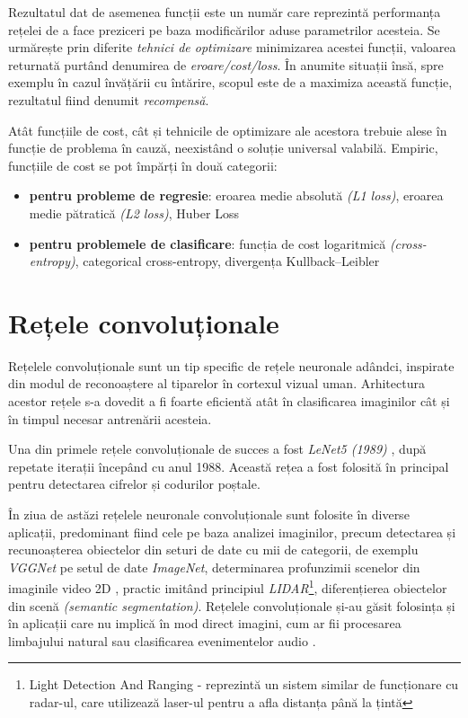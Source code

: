 Rezultatul dat de asemenea funcții este un număr care reprezintă performanța rețelei de a face preziceri pe baza modificărilor aduse parametrilor acesteia. Se urmărește prin diferite \textit{tehnici de optimizare} minimizarea acestei funcții, valoarea returnată purtând denumirea de \textit{eroare/cost/loss}. În anumite situații însă, spre exemplu în cazul învățării cu întărire, scopul este de a maximiza această funcție, rezultatul fiind denumit \textit{recompensă}.

Atât funcțiile de cost, cât și tehnicile de optimizare ale acestora trebuie alese în funcție de problema în cauză, neexistând o soluție universal valabilă. Empiric, funcțiile de cost se pot împărți în două categorii:
\begin{itemize}
\item \textbf{pentru probleme de regresie}: eroarea medie absolută \textit{(L1 loss)}, eroarea medie pătratică \textit{(L2 loss)},  Huber Loss
\item \textbf{pentru problemele de clasificare}: funcția de cost logaritmică \textit{(cross-entropy)}, categorical cross-entropy, divergența Kullback–Leibler
\end{itemize}

\section{Rețele convoluționale}\label{sec:reteleconv}
Rețelele convoluționale sunt un tip specific de rețele neuronale adândci, inspirate din modul de reconoaștere al tiparelor în cortexul vizual uman. Arhitectura acestor rețele s-a dovedit a fi foarte eficientă atât în clasificarea imaginilor cât și în timpul necesar antrenării acesteia.

Una din primele rețele convoluționale de succes a fost \textit{LeNet5 (1989)} \cite{LeNet5}, după repetate iterații începând cu anul 1988. Această rețea a fost folosită în principal pentru detectarea cifrelor și codurilor poștale.

În ziua de astăzi rețelele neuronale convoluționale sunt folosite în diverse aplicații, predominant fiind cele pe baza analizei imaginilor, precum detectarea și recunoașterea obiectelor din seturi de date cu mii de categorii, de exemplu \textit{VGGNet} \cite{simonyan2014deep} pe setul de date \textit{ImageNet}, determinarea profunzimii scenelor din imaginile video 2D \cite{zhou2017unsupervised}, practic imitând principiul \textit{LIDAR}\footnote{Light Detection And Ranging - reprezintă un sistem similar de funcționare cu radar-ul, care utilizează laser-ul pentru a afla distanța până la țintă}, diferențierea obiectelor din scenă \textit{(semantic segmentation)}. Rețelele convoluționale și-au găsit folosința și în aplicații care nu implică în mod direct imagini, cum ar fii procesarea limbajului natural sau clasificarea evenimentelor audio \cite{cnnaudioclass}.

